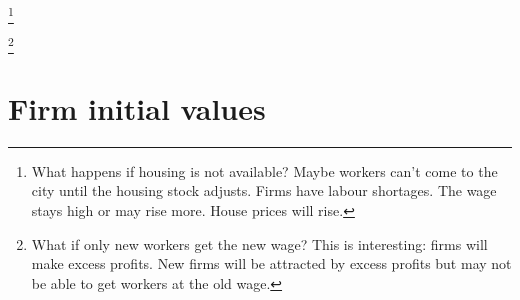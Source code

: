 \footnote{What happens if housing is not available? Maybe workers can't come to the city until the housing stock adjusts. Firms have labour shortages.  The wage stays high or may rise more. House prices will rise.} 

\footnote{What if only new workers get the new wage? This is interesting: firms will make excess profits. New firms will be attracted by excess profits but may not be able to get workers at the old wage.}





\section{Firm initial values}

